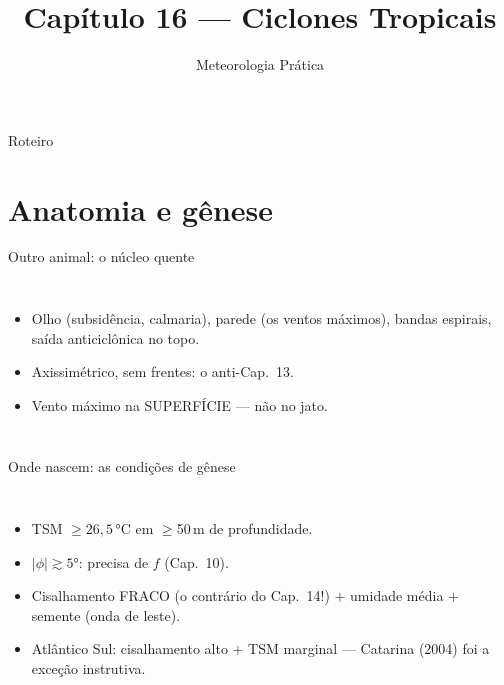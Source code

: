 \documentclass[aspectratio=169,11pt]{beamer}
\title[Cap. 16 --- Ciclones Tropicais]{Capítulo 16 --- Ciclones
Tropicais}
\subtitle{Meteorologia Prática}
\author{}
\date{}
\begin{document}
\begin{frame}
  \titlepage
  \vfill
  \atribuicao
\end{frame}

\begin{frame}{Roteiro}
  \tableofcontents
\end{frame}

\section{Anatomia e gênese}

\begin{frame}{Outro animal: o núcleo quente}
  \begin{columns}
    \begin{itemize}
      \item Olho (subsidência, calmaria), \alert{parede} (os ventos
            máximos), bandas espirais, saída anticiclônica no topo.
      \item Axissimétrico, sem frentes: o anti-Cap.~13.
      \item Vento máximo na SUPERFÍCIE — não no jato.
    \end{itemize}
  \end{columns}
\end{frame}

\begin{frame}{Onde nascem: as condições de gênese}
  \begin{columns}
    \begin{itemize}
      \item TSM $\ge 26{,}5\,°$C em $\ge$50\,m de profundidade.
      \item $|\phi| \gtrsim 5°$: precisa de $f$ (Cap.~10).
      \item Cisalhamento FRACO (o contrário do Cap.~14!) $+$ umidade
            média $+$ semente (onda de leste).
      \item Atlântico Sul: cisalhamento alto $+$ TSM marginal —
            Catarina (2004) foi a exceção instrutiva.
    \end{itemize}
  \end{columns}
\end{frame}
\end{document}
